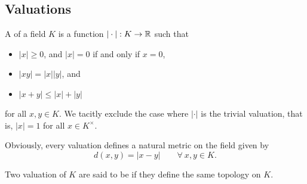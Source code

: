 \subsection{Valuations}

\begin{definition}
    A  of a field $K$ is a function $|\cdot|: K\to\mathbb{R}$ such that 
    \begin{itemize}
        \item $|x|\ge 0$, and $|x| = 0$ if and only if $x = 0$, 
        \item $|xy| = |x||y|$, and 
        \item $|x + y|\le |x| + |y|$
    \end{itemize}
    for all $x,y\in K$. We tacitly exclude the case where $|\cdot|$ is the trivial valuation, that is, $|x|= 1$ for all $x\in K^\times$.
\end{definition}

Obviously, every valuation defines a natural metric on the field given by 
\begin{equation*}
    d(x, y) = |x - y|\qquad\forall~x,y\in K.
\end{equation*}

\begin{definition}
    Two valuation of $K$ are said to be  if they define the same topology on $K$.
\end{definition}

